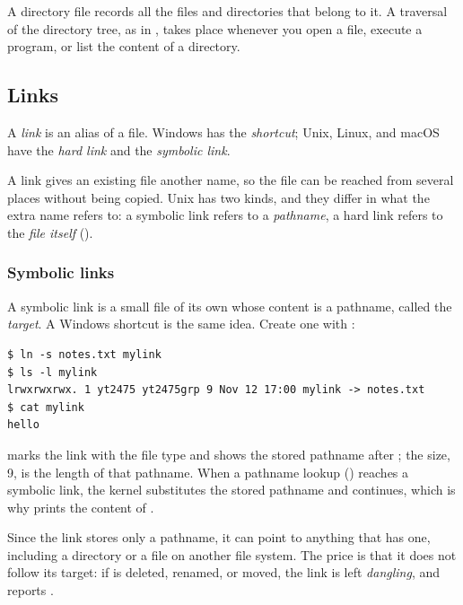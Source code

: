 \begin{keypoint}
  A directory file records all the files and directories that belong to it. A traversal of the directory tree, as in , takes place whenever you open a file, execute a program, or list the content of a directory.
\end{keypoint}

\subsection{Links}

\begin{definition}[Link]
  A \emph{link} is an alias of a file. Windows has the \emph{shortcut}; Unix, Linux, and macOS have the \emph{hard link} and the \emph{symbolic link}.
\end{definition}

A link gives an existing file another name, so the file can be reached from several places without being copied. Unix has two kinds, and they differ in what the extra name refers to: a symbolic link refers to a \emph{pathname}, a hard link refers to the \emph{file itself} ().

\subsubsection{Symbolic links}
A symbolic link is a small file of its own whose content is a pathname, called the \emph{target}. A Windows shortcut is the same idea. Create one with :
\begin{lstlisting}[style=sh]
$ ln -s notes.txt mylink
$ ls -l mylink
lrwxrwxrwx. 1 yt2475 yt2475grp 9 Nov 12 17:00 mylink -> notes.txt
$ cat mylink
hello
\end{lstlisting}
 marks the link with the file type  and shows the stored pathname after \code{->}; the size, 9, is the length of that pathname. When a pathname lookup () reaches a symbolic link, the kernel substitutes the stored pathname and continues, which is why  prints the content of .

Since the link stores only a pathname, it can point to anything that has one, including a directory or a file on another file system. The price is that it does not follow its target: if  is deleted, renamed, or moved, the link is left \emph{dangling}, and  reports .

